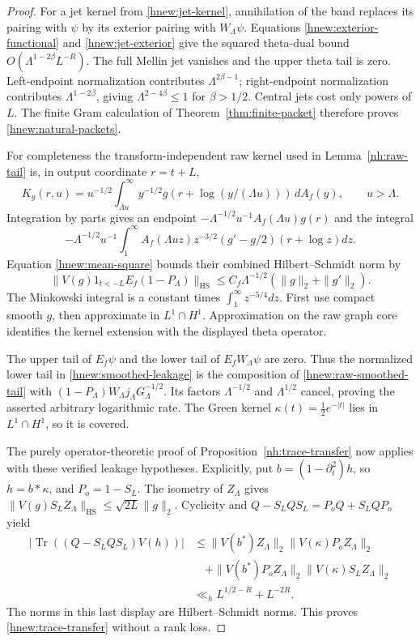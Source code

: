 \begin{proof}
For a jet kernel from \eqref{hnew:jet-kernel}, annihilation of the
band replaces its pairing with $\psi$ by its exterior pairing
with $W_\Lambda\psi$.
Equations \eqref{hnew:exterior-functional} and
\eqref{hnew:jet-exterior} give the squared theta-dual bound
$O(\Lambda^{1-2\beta}L^{-R})$.
The full Mellin jet vanishes and the upper theta tail is zero.
Left-endpoint normalization contributes $\Lambda^{2\beta-1}$;
right-endpoint normalization contributes $\Lambda^{1-2\beta}$,
giving $\Lambda^{2-4\beta}\le1$ for $\beta>1/2$.
Central jets cost only powers of $L$.
The finite Gram calculation of Theorem~\ref{thm:finite-packet}
therefore proves \eqref{hnew:natural-packets}.

For completeness the transform-independent raw kernel used in
Lemma~\ref{nh:raw-tail} is, in output coordinate $r=t+L$,
\[
 K_g(r,u)=u^{-1/2}\int_{\Lambda u}^\infty
   y^{-1/2}g(r+\log(y/(\Lambda u)))\,dA_f(y),\qquad u>\Lambda.
\]
Integration by parts gives an endpoint
$-\Lambda^{-1/2}u^{-1}A_f(\Lambda u)g(r)$ and the integral
\[
 -\Lambda^{-1/2}u^{-1}\int_1^\infty A_f(\Lambda uz)z^{-3/2}
                    (g'-g/2)(r+\log z)dz.
\]
Equation \eqref{hnew:mean-square} bounds their combined
Hilbert--Schmidt norm by
\begin{equation}\label{hnew:raw-smoothed-tail}
 \|V(g)1_{t<-L}E_f(1-P_\Lambda)\|_{\mathrm{HS}}
       \le C_f\Lambda^{-1/2}(\|g\|_2+\|g'\|_2).
\end{equation}
The Minkowski integral is a constant times
$\int_1^\infty z^{-5/4}dz$.
First use compact smooth $g$, then approximate in $L^1\cap H^1$.
Approximation on the raw graph core identifies the kernel
extension with the displayed theta operator.

The upper tail of $E_f\psi$ and the lower tail of $E_fW_\Lambda\psi$
are zero.  Thus the normalized lower tail in
\eqref{hnew:smoothed-leakage} is the composition of
\eqref{hnew:raw-smoothed-tail} with
$(1-P_\Lambda)W_\Lambda j_\Lambda G_\Lambda^{-1/2}$.
Its factors $\Lambda^{-1/2}$ and $\Lambda^{1/2}$ cancel, proving
the asserted arbitrary logarithmic rate.
The Green kernel $\kappa(t)=\tfrac12e^{-|t|}$ lies in
$L^1\cap H^1$, so it is covered.

The purely operator-theoretic proof of
Proposition~\ref{nh:trace-transfer} now applies with these verified
leakage hypotheses.  Explicitly, put $b=(1-\partial_t^2)h$, so
$h=b*\kappa$, and $P_o=1-S_L$.
The isometry of $Z_\Lambda$ gives
$\|V(g)S_LZ_\Lambda\|_{\mathrm{HS}}\le\sqrt{2L}\|g\|_2$.
Cyclicity and $Q-S_LQS_L=P_oQ+S_LQP_o$ yield
\begin{align*}
 |\operatorname{Tr}((Q-S_LQS_L)V(h))|
 &\le\|V(b^*)Z_\Lambda\|_2\|V(\kappa)P_oZ_\Lambda\|_2\\
 &\quad+\|V(b^*)P_oZ_\Lambda\|_2
                         \|V(\kappa)S_LZ_\Lambda\|_2\\
 &\ll_h L^{1/2-R}+L^{-2R}.
\end{align*}
The norms in this last display are Hilbert--Schmidt norms.
This proves \eqref{hnew:trace-transfer} without a rank loss.
\end{proof}

